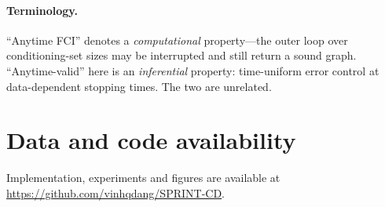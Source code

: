 \documentclass[11pt,a4paper]{article}
\theoremstyle{definition}
\theoremstyle{remark}
\begin{document}
\paragraph{Terminology.} ``Anytime FCI'' \citep{spirtes2001anytime} denotes a
\emph{computational} property---the outer loop over conditioning-set sizes may be
interrupted and still return a sound graph. ``Anytime-valid'' here is an
\emph{inferential} property: time-uniform error control at data-dependent
stopping times. The two are unrelated.

\section*{Data and code availability}
Implementation, experiments and figures are available at
\url{https://github.com/vinhqdang/SPRINT-CD}.
\end{document}
